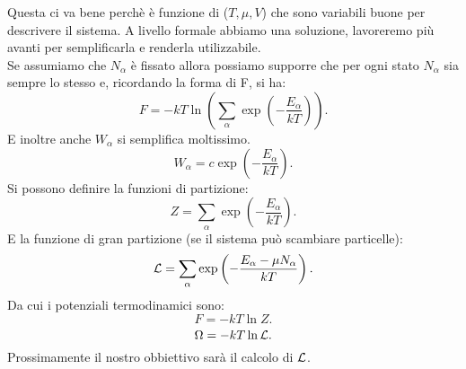 Questa ci va bene perchè è funzione di ($T, \mu, V$) che sono variabili buone per descrivere il sistema. A livello formale abbiamo una soluzione, lavoreremo più avanti per semplificarla e renderla utilizzabile.\\
Se assumiamo che $N_{\alpha}$ è fissato allora possiamo supporre che per ogni stato $N_{\alpha}$ sia sempre lo stesso e, ricordando la forma di F, si ha:
\[
	F = -kT \ln\left( \sum_{\alpha}^{} \exp\left( -\frac{E_{\alpha}}{kT} \right)  \right) 
.\] 
E inoltre anche $W_{\alpha}$ si semplifica moltissimo.
\[
	W_{\alpha}= c \exp\left( -\frac{E_{\alpha}}{kT} \right) 
.\] 
Si possono definire la funzioni di partizione:
\[
	Z = \sum_{\alpha}^{} \exp\left( -\frac{E_{\alpha}}{kT} \right) 
.\] 
E la funzione di gran partizione (se il sistema può scambiare particelle):
\[
	\mathcal{L} = \sum_{\alpha}^{} \exp\left( - \frac{E_{\alpha}-\mu N_{\alpha}}{kT} \right) 
.\] 
Da cui i potenziali termodinamici sono:
\[
	F = -kT \ln Z
.\] \label{eq:F_Z}
\[
	\Omega = -kT \ln \mathcal{L}
.\] 
Prossimamente il nostro obbiettivo sarà il calcolo di $\mathcal{L}$.
	
